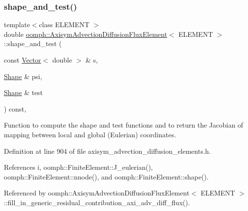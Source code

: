 \subsubsection{\texorpdfstring{shape\+\_\+and\+\_\+test()}{shape\_and\_test()}}
{\footnotesize\ttfamily template$<$class E\+L\+E\+M\+E\+NT $>$ \\
double \hyperlink{classoomph_1_1AxisymAdvectionDiffusionFluxElement}{oomph\+::\+Axisym\+Advection\+Diffusion\+Flux\+Element}$<$ E\+L\+E\+M\+E\+NT $>$\+::shape\+\_\+and\+\_\+test (\begin{DoxyParamCaption}\item[{const \hyperlink{classoomph_1_1Vector}{Vector}$<$ double $>$ \&}]{s,  }\item[{\hyperlink{classoomph_1_1Shape}{Shape} \&}]{psi,  }\item[{\hyperlink{classoomph_1_1Shape}{Shape} \&}]{test }\end{DoxyParamCaption}) const\hspace{0.3cm}{\ttfamily [inline]}, {\ttfamily [protected]}}



Function to compute the shape and test functions and to return the Jacobian of mapping between local and global (Eulerian) coordinates. 



Definition at line 904 of file axisym\+\_\+advection\+\_\+diffusion\+\_\+elements.\+h.



References i, oomph\+::\+Finite\+Element\+::\+J\+\_\+eulerian(), oomph\+::\+Finite\+Element\+::nnode(), and oomph\+::\+Finite\+Element\+::shape().



Referenced by oomph\+::\+Axisym\+Advection\+Diffusion\+Flux\+Element$<$ E\+L\+E\+M\+E\+N\+T $>$\+::fill\+\_\+in\+\_\+generic\+\_\+residual\+\_\+contribution\+\_\+axi\+\_\+adv\+\_\+diff\+\_\+flux().

\mbox{\label{classoomph_1_1AxisymAdvectionDiffusionFluxElement_a5e1b027b49e09642d2dc39c61479c782}} 
